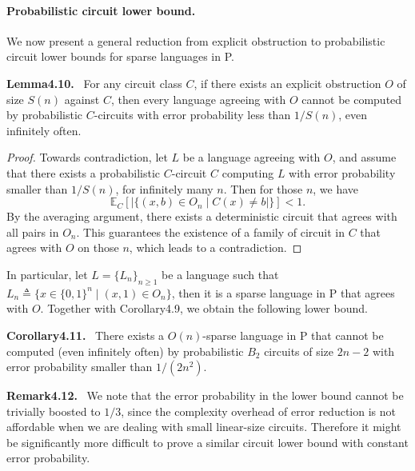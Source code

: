 \documentclass[10pt,a4paper]{article}
\newenvironment{authorclaim}[1]{\par\medskip\noindent\textbf{#1.}\ }{\par\medskip}
\begin{document}
\paragraph{Probabilistic circuit lower bound.} We now present a general reduction from explicit obstruction to probabilistic circuit lower bounds for sparse languages in P.
\begin{authorclaim}{Lemma4.10}
For any circuit class $C$, if there exists an explicit obstruction $O$ of size $S(n)$ against $C$, then every language agreeing with $O$ cannot be computed by probabilistic $C$-circuits with error probability less than $1/S(n)$, even infinitely often.
\end{authorclaim}
\begin{proof}
Towards contradiction, let $L$ be a language agreeing with $O$, and assume that there exists a probabilistic $C$-circuit $C$ computing $L$ with error probability smaller than $1/S(n)$, for infinitely many $n$. Then for those $n$, we have
\[\mathbb E_C[|\{(x,b)\in O_n\mid C(x)\ne b|\}]<1.\]
By the averaging argument, there exists a deterministic circuit that agrees with all pairs in $O_n$. This guarantees the existence of a family of circuit in $C$ that agrees with $O$ on those $n$, which leads to a contradiction.
\end{proof}
In particular, let $L=\{L_n\}_{n\ge1}$ be a language such that $L_n\triangleq\{x\in\{0,1\}^n\mid(x,1)\in O_n\}$, then it is a sparse language in P that agrees with $O$. Together with Corollary4.9, we obtain the following lower bound.
\begin{authorclaim}{Corollary4.11}
There exists a $O(n)$-sparse language in P that cannot be computed (even infinitely often) by probabilistic $B_2$ circuits of size $2n-2$ with error probability smaller than $1/(2n^2)$.
\end{authorclaim}
\begin{authorclaim}{Remark4.12}
We note that the error probability in the lower bound cannot be trivially boosted to $1/3$, since the complexity overhead of error reduction is not affordable when we are dealing with small linear-size circuits. Therefore it might be significantly more difficult to prove a similar circuit lower bound with constant error probability.
\end{authorclaim}
\end{document}

